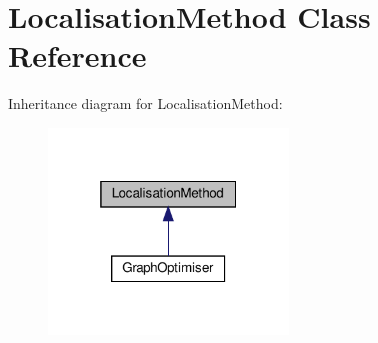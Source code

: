 \hypertarget{classLocalisationMethod}{}\section{Localisation\+Method Class Reference}
\label{classLocalisationMethod}


Inheritance diagram for Localisation\+Method\+:
\nopagebreak
\begin{figure}[H]
\begin{center}
\leavevmode
\includegraphics[width=181pt]{classLocalisationMethod__inherit__graph}
\end{center}
\end{figure}
